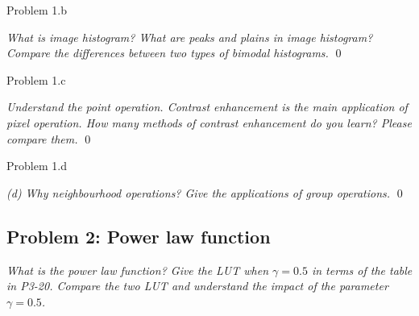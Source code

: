 \documentclass[
        ]{beamer}
\begin{document}
        \begin{frame}[c]{Problem 1.b}
    			\begin{overprint}
            \emph{What is image histogram? What are peaks and plains in image histogram? Compare the differences between two types of bimodal histograms.}
                \qed
            \end{overprint}            
        \end{frame}
        
        \begin{frame}[c]{Problem 1.c}
    			\begin{overprint}
            \emph{Understand the point operation. Contrast enhancement is the main application of pixel operation. How many methods of contrast enhancement do you learn? Please compare them.}
                \qed
            \end{overprint}            
        \end{frame}
        
        \begin{frame}[c]{Problem 1.d}
    			\begin{overprint}
            \emph{(d)	Why neighbourhood operations? Give the applications of group operations.}
                \qed
            \end{overprint}            
        \end{frame}
        
    \subsection{Problem 2: Power law function}
        \begin{frame}[c]{\subsecname}
            \emph{What is the power law function? Give the LUT when $\gamma=0.5$ in terms of the table in P3-20. Compare the two LUT and understand the impact of the parameter $\gamma=0.5$.}
        \end{frame}
        
\end{document}
